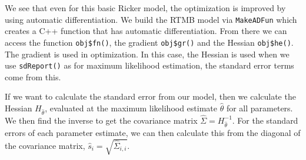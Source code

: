 \documentclass[
]{article}
\newenvironment{Shaded}{\begin{snugshade}}{\end{snugshade}}
\newcommand{\CommentTok}[1]{\textcolor[rgb]{0.56,0.35,0.01}{\textit{#1}}}
\newcommand{\DocumentationTok}[1]{\textcolor[rgb]{0.56,0.35,0.01}{\textbf{\textit{#1}}}}
\newcommand{\FunctionTok}[1]{\textcolor[rgb]{0.13,0.29,0.53}{\textbf{#1}}}
\newcommand{\NormalTok}[1]{#1}
\newcommand{\OtherTok}[1]{\textcolor[rgb]{0.56,0.35,0.01}{#1}}
\newcommand{\SpecialCharTok}[1]{\textcolor[rgb]{0.81,0.36,0.00}{\textbf{#1}}}
\newcommand{\StringTok}[1]{\textcolor[rgb]{0.31,0.60,0.02}{#1}}
\begin{document}
\begin{Shaded}
\end{Shaded}

We see that even for this basic Ricker model, the optimization is
improved by using automatic differentiation. We build the RTMB model via
\texttt{MakeADFun} which creates a C++ function that has automatic
differentiation. From there we can access the function
\texttt{obj\$fn()}, the gradient \texttt{obj\$gr()} and the Hessian
\texttt{obj\$he()}. The gradient is used in optimization. In this case,
the Hessian is used when we use \texttt{sdReport()} as for maximum
likelihood estimation, the standard error terms come from this.

If we want to calculate the standard error from our model, then we
calculate the Hessian \(H_{\widehat{\theta}}\), evaluated at the maximum
likelihood estimate \(\widehat{\theta}\) for all parameters. We then
find the inverse to get the covariance matrix
\(\widehat{\Sigma} = H_{\widehat{\theta}}^{-1}\). For the standard
errors of each parameter estimate, we can then calculate this from the
diagonal of the covariance matrix,
\(\widehat{s}_i = \sqrt{\widehat{\Sigma}_{i,i}}\).
\end{document}
